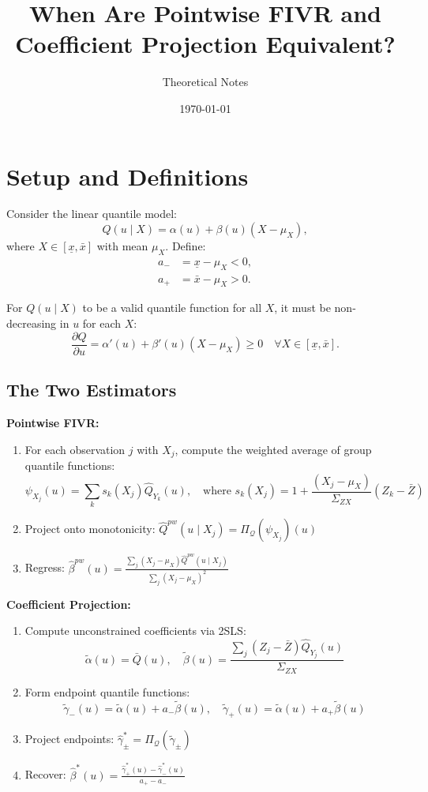 \documentclass[12pt]{article}
\title{When Are Pointwise FIVR and Coefficient Projection Equivalent?}
\author{Theoretical Notes}
\date{\today}
\newcommand{\PiQ}{\Pi_{\mathcal{Q}}}
\begin{document}
\maketitle

\section{Setup and Definitions}

Consider the linear quantile model:
\begin{equation}
Q(u \mid X) = \alpha(u) + \beta(u) (X - \mu_X),
\end{equation}
where $X \in [\underline{x}, \bar{x}]$ with mean $\mu_X$. Define:
\begin{align}
a_- &= \underline{x} - \mu_X < 0, \\
a_+ &= \bar{x} - \mu_X > 0.
\end{align}

For $Q(u \mid X)$ to be a valid quantile function for all $X$, it must be non-decreasing in $u$ for each $X$:
\begin{equation}
\frac{\partial Q}{\partial u} = \alpha'(u) + \beta'(u)(X - \mu_X) \geq 0 \quad \forall X \in [\underline{x}, \bar{x}].
\end{equation}

\subsection{The Two Estimators}

\textbf{Pointwise FIVR:}
\begin{enumerate}
\item For each observation $j$ with $X_j$, compute the weighted average of group quantile functions:
\[
\psi_{X_j}(u) = \sum_k s_k(X_j) \hat{Q}_{Y_k}(u), \quad \text{where } s_k(X_j) = 1 + \frac{(X_j - \mu_X)}{\Sigma_{ZX}} (Z_k - \bar{Z})
\]
\item Project onto monotonicity: $\hat{Q}^{pw}(u \mid X_j) = \PiQ(\psi_{X_j})(u)$
\item Regress: $\hat{\beta}^{pw}(u) = \frac{\sum_j (X_j - \mu_X) \hat{Q}^{pw}(u \mid X_j)}{\sum_j (X_j - \mu_X)^2}$
\end{enumerate}

\textbf{Coefficient Projection:}
\begin{enumerate}
\item Compute unconstrained coefficients via 2SLS:
\[
\tilde{\alpha}(u) = \bar{Q}(u), \quad \tilde{\beta}(u) = \frac{\sum_j (Z_j - \bar{Z}) \hat{Q}_{Y_j}(u)}{\Sigma_{ZX}}
\]
\item Form endpoint quantile functions:
\[
\tilde{\gamma}_-(u) = \tilde{\alpha}(u) + a_- \tilde{\beta}(u), \quad \tilde{\gamma}_+(u) = \tilde{\alpha}(u) + a_+ \tilde{\beta}(u)
\]
\item Project endpoints: $\hat{\gamma}_\pm^* = \PiQ(\tilde{\gamma}_\pm)$
\item Recover: $\hat{\beta}^*(u) = \frac{\hat{\gamma}_+^*(u) - \hat{\gamma}_-^*(u)}{a_+ - a_-}$
\end{enumerate}
\end{document}
